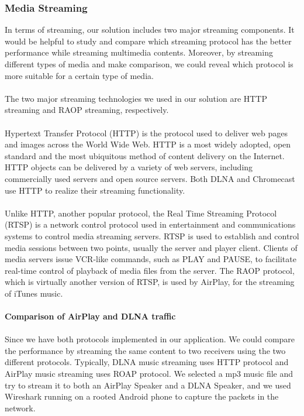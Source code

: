 \subsubsection{Media Streaming}
In terms of streaming, our solution includes two major streaming components. It would be helpful to study and compare which streaming protocol has the better performance while streaming multimedia contents. Moreover, by streaming different types of media and make comparison, we could reveal which protocol is more suitable for a certain type of media. \\
\\The two major streaming technologies we used in our solution are HTTP streaming and RAOP streaming, respectively.\\
\\
Hypertext Transfer Protocol (HTTP) is the protocol used to deliver web pages and images across the World Wide Web. HTTP is a most widely adopted, open standard and the most ubiquitous method of content delivery on the Internet. HTTP objects can be delivered by a variety of web servers, including commercially used servers and open source servers. Both DLNA and Chromecast use HTTP to realize their streaming functionality.\\
\\
Unlike HTTP, another popular protocol, the Real Time Streaming Protocol (RTSP) is a network control protocol used in entertainment and communications systems to control media streaming servers. RTSP is used to establish and control media sessions between two points, usually the server and player client. Clients of media servers issue VCR-like commands, such as PLAY and PAUSE, to facilitate real-time control of playback of media files from the server.  The RAOP protocol, which is virtually another version of RTSP, is used by AirPlay, for the streaming of iTunes music.\\
\\
\textbf{Comparison of AirPlay and DLNA traffic}\\
\\
Since we have both protocols implemented in our application. We could compare the performance by streaming the same content to two receivers using the two different protocols. Typically, DLNA music streaming uses HTTP protocol and AirPlay music streaming uses ROAP protocol. We selected a mp3 music file and try to stream it to both an AirPlay Speaker and a DLNA Speaker, and we used Wireshark running on a rooted Android phone to capture the packets in the network.\\
